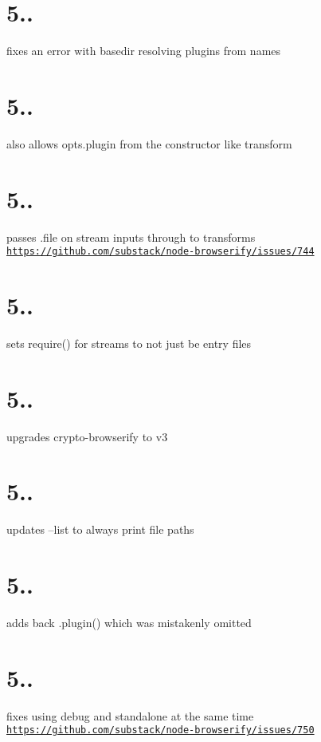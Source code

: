 \section*{5..}

fixes an error with basedir resolving plugins from names

\section*{5..}

also allows opts.\+plugin from the constructor like transform

\section*{5..}

passes {\ttfamily .file} on stream inputs through to transforms \href{https://github.com/substack/node-browserify/issues/744}{\tt https\+://github.\+com/substack/node-\/browserify/issues/744}

\section*{5..}

sets require() for streams to not just be entry files

\section*{5..}

upgrades crypto-\/browserify to v3

\section*{5..}

updates --list to always print file paths

\section*{5..}

adds back {\ttfamily .plugin()} which was mistakenly omitted

\section*{5..}

fixes using debug and standalone at the same time \href{https://github.com/substack/node-browserify/issues/750}{\tt https\+://github.\+com/substack/node-\/browserify/issues/750}

